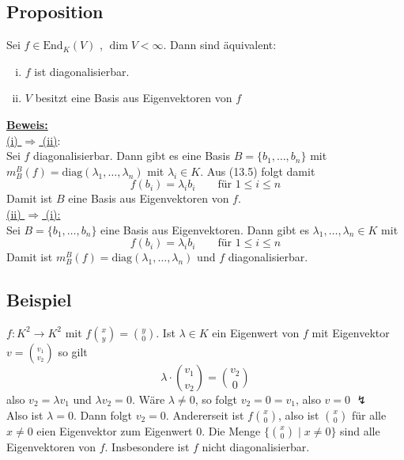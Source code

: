 \subsection{Proposition} %
\label{sub:proposition}
Sei $f \in \text{End}_K (V)$ , $\dim V < \infty$. Dann sind äquivalent:
\begin{enumerate}[(i)]
	\item $f$ ist diagonalisierbar.
	\item $V$ besitzt eine Basis aus Eigenvektoren von $f$
\end{enumerate}
\underline{\textbf{Beweis:}} 
\vspace{7pt} \\
\underline{ (i) $\Rightarrow $ (ii)}: 
\vspace{5pt} \\
Sei $f$ diagonalisierbar. Dann gibt es eine Basis $B =\{b_1, \ldots , b_n \}$ mit $m_B^B (f)= \text{diag}(\lambda_1, \ldots , \lambda_n)$ mit 
$\lambda_i \in K$. Aus (13.5) folgt damit 
\[
	f(b_i) = \lambda_i b_i \qquad \text{für } 1 \le i \le n
\]
Damit ist $B$ eine Basis aus Eigenvektoren von $f$.
\vspace{\baselineskip} \\
\underline{(ii) $\Rightarrow $ (i):} 
\vspace{5pt} \\
Sei $B=\{ b_1, \ldots , b_n \}$ eine Basis aus Eigenvektoren. Dann gibt es $\lambda_1, \ldots , \lambda_n \in K$ mit
\[
	f(b_i) = \lambda_i b_i \qquad \text{für } 1 \le i \le n
\]
Damit ist $m_B^B(f) = \text{diag} (\lambda_1, \ldots , \lambda_n)$ und $f$ diagonalisierbar.

\subsection{Beispiel} %
\label{sub:beispiel}
$f : K^2 \to K^2$ mit $f \binom{x}{y} = \binom{y}{0}$. Ist $\lambda  \in K$ ein Eigenwert von $f$ mit Eigenvektor $v= \binom{v_1}{v_2}$ so gilt
\[
	\lambda \cdot \binom{v_1}{v_2} = \binom{v_2}{0}
\]
also $v_2 = \lambda v_1$ und $\lambda v_2 = 0$. Wäre $\lambda \not= 0$, so folgt $v_2= 0 = v_1$, also $v=0$ {\huge $\lightning$} \\
Also ist $\lambda = 0$. Dann folgt $v_2 = 0$. Andererseit ist $f \binom{x}{0}$, also ist $\binom{x}{0}$ für alle $x \not= 0$ eien Eigenvektor zum Eigenwert 0.
Die Menge $\{ \binom{x}{0} \mid x \not= 0\}$ sind alle Eigenvektoren von $f$. Insbesondere ist $f$ nicht diagonalisierbar.

